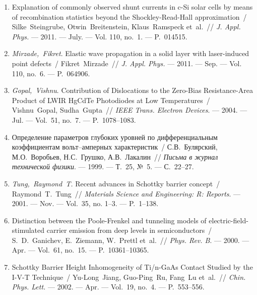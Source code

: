 \begin{center}
\textbf{\MakeUppercase{\fullbibtitle}}
\end{center}

\begin{enumerate}[label=\arabic*$^*$.,leftmargin=0em,itemindent=3em]
\item
Explanation of commonly observed shunt currents in c-Si solar cells by means of
  recombination statistics beyond the Shockley-Read-Hall approximation~/
  Silke~Steingrube, Otwin~Breitenstein, Klaus~Ramspeck et~al.~// \emph{J.
  Appl. Phys.} ---
  2011. --- July. ---
  Vol. 110, no.~1. ---
  P.~014515.

\item
\emph{Mirzade,~Fikret}. Elastic wave propagation in a solid layer with
  laser-induced point defects~/ Fikret~Mirzade~// \emph{J. Appl. Phys.} ---
  2011. --- Sep. ---
  Vol. 110, no.~6. ---
  P.~064906.

\item
\emph{Gopal,~Vishnu}. Contribution of Dislocations to the Zero-Bias
  Resistance-Area Product of {LWIR} {H}g{C}d{T}e Photodiodes at Low
  Temperatures~/ Vishnu~Gopal, Sudha~Gupta~// \emph{IEEE Trans. Electron
  Devices}. ---
  2004. --- Jul. ---
  Vol.~51, no.~7. ---
  P.~1078--1083.

\item
Определение параметров глубоких уровней
  по дифференциальным коэффициентам
  вольт--амперных характеристик~/
  С.В.~Булярский, М.О.~Воробьев, Н.С.~Грушко,
  А.В.~Лакалин~// \emph{Письма в журнал
  технической физики}. ---
  1999. ---
  Т.~25, {№}~5. ---
  {С.}~22--27.

\item
\emph{Tung,~Raymond~T.} Recent advances in {S}chottky barrier concept~/
  Raymond~T.~Tung~// \emph{Materials Science and Engineering: R: Reports}.
  ---
  2001. --- Nov. ---
  Vol.~35, no. 1--3. ---
  P.~1--138.

\item
Distinction between the {P}oole-{F}renkel and tunneling models of
  electric-field-stimulated carrier emission from deep levels in
  semiconductors~/ S.~D.~Ganichev, E.~Ziemann, W.~Prettl et~al.~//
  \emph{Phys. Rev. B}. ---
  2000. --- Apr. ---
  Vol.~61, no.~15. ---
  P.~10361--10365.

\item
Schottky Barrier Height Inhomogeneity of Ti/n-GaAs Contact Studied by the I-V-T
  Technique~/ Yu-Long~Jiang, Guo-Ping~Ru, Fang~Lu et~al.~// \emph{Chin.
  Phys. Lett.} ---
  2002. --- Apr. ---
  Vol.~19, no.~4. ---
  P.~553--556.


\end{enumerate}
